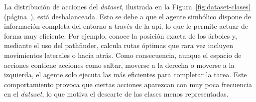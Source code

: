 \begin{table}[htbp]
  \centering
  \caption[Estructura de los \textit{frames} del dataset.]{Estructura de los \textit{frames} del \textit{dataset} de demostraciones
  generado por el \gls{htn}. La posición absoluta se guarda para calcular el desplazamiento entre \textit{frames} posteriormente.}
  \label{tab:dataset-frame}
\end{table} 

La distribución de acciones del \textit{dataset}, ilustrada en la Figura~\ref{fig:dataset-clases} (página~\pageref{fig:dataset-clases}), está desbalanceada.
Esto se debe a que el agente simbólico dispone de información completa del entorno a través de la \acrshort{api},
lo que le permite actuar de forma muy eficiente. Por ejemplo, conoce la posición exacta de los árboles y, 
mediante el uso del \gls{pathfinder}, calcula rutas óptimas que rara vez incluyen movimientos laterales o hacia atrás. 
Como consecuencia, aunque el espacio de acciones contiene acciones como saltar, moverse a la derecha o moverse a la izquierda, 
el agente solo ejecuta las más eficientes para completar la tarea. Este comportamiento provoca que ciertas 
acciones aparezcan con muy poca frecuencia en el \textit{dataset}, lo que motiva el descarte de las clases menos representadas.

